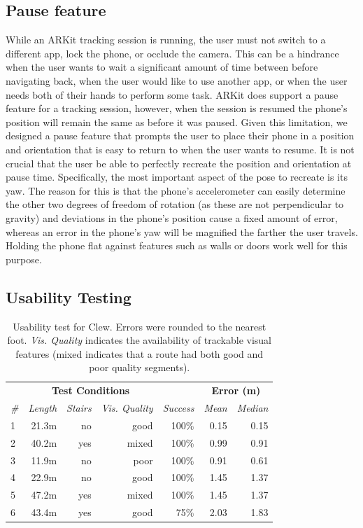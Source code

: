 \documentclass[chi_draft]{sigchi}
\begin{document}
\subsection{Pause feature}
While an ARKit tracking session is running, the user must not switch to a different app, lock the phone, or occlude the camera.  This can be a hindrance when the user wants to wait a significant amount of time between before navigating back, when the user would like to use another app, or when the user needs both of their hands to perform some task.  ARKit does support a pause feature for a tracking session, however, when the session is resumed the phone's position will remain the same as before it was paused.  Given this limitation, we designed a pause feature that prompts the user to place their phone in a position and orientation that is easy to return to when the user wants to resume.  It is not crucial that the user be able to perfectly recreate the position and orientation at pause time.  Specifically, the most important aspect of the pose to recreate is its yaw.  The reason for this is that the phone's accelerometer can easily determine the other two degrees of freedom of rotation (as these are not perpendicular to gravity) and deviations in the phone's position cause a fixed amount of error, whereas an error in the phone's yaw will be magnified the farther the user travels.  Holding the phone flat against features such as walls or doors work well for this purpose.  

\subsection{Usability Testing}

\begin{table}
  \centering
  \begin{tabular}{l r r r r r r}
    & \multicolumn{3}{c}{\small{\textbf{Test Conditions}}} &  & \multicolumn{2}{c}{\small{\textbf{Error (m)}}} \\
    \cmidrule(r){2-4}     \cmidrule(r){6-7}
    {\small\textit{\#}}
    & {\small \textit{Length}}
      & {\small \textit{Stairs}}
    & {\small \textit{Vis. Quality}}
        & {\small \textit{Success}}
        & {\small \textit{Mean}} 
                & {\small \textit{Median}} \\
    \midrule
    1 & 21.3m & no & good & 100\% & 0.15 & 0.15 \\
    2 & 40.2m & yes & mixed & 100\% & 0.99 & 0.91 \\
    3 & 11.9m & no & poor & 100\% & 0.91 & 0.61 \\
    4 & 22.9m & no & good & 100\% & 1.45 & 1.37 \\
        5 & 47.2m & yes & mixed & 100\%& 1.45 & 1.37 \\
            6 & 43.4m & yes & good & 75\% & 2.03 & 1.83 \\
  \end{tabular}
  \caption{Usability test for Clew.  Errors were rounded to the nearest foot.  \emph{Vis. Quality} indicates the availability of trackable visual features (mixed indicates that a route had both good and poor quality segments).}~\label{tab:clewusability}
\end{table}
\end{document}
